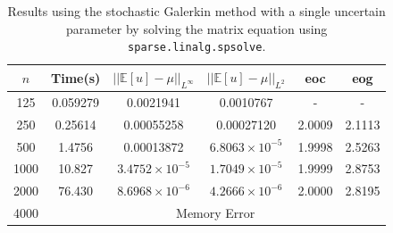 \documentclass[11pt]{article}
\numberwithin{equation}{section}
\begin{document}
\begin{table}[H]
\centering
\begin{tabular}{|c|c|c|c|c|c|}
\hline
$n$ & Time(s) & $|| \mathbb{E}[u] - \mu ||_{L^{\infty}}$ & $|| \mathbb{E}[u] - \mu ||_{L^{2}}$ & eoc & eog \\
\hline
125 & 0.059279 & 0.0021941 & 0.0010767 & - & - \\
250 & 0.25614 & 0.00055258 & 0.00027120 & 2.0009 & 2.1113 \\
500 & 1.4756 & 0.00013872 & $6.8063 \times 10^{-5}$ & 1.9998 & 2.5263 \\
1000 & 10.827 & $3.4752 \times 10^{-5}$ & $1.7049 \times 10^{-5}$ & 1.9999 & 2.8753 \\
2000 & 76.430 & $8.6968 \times 10^{-6}$ & $4.2666 \times 10^{-6}$ & 2.0000 & 2.8195 \\
\cline{2-6}
4000 & \multicolumn{5}{c|}{Memory Error} \\
\hline
\end{tabular}
\captionsetup{justification=centering}
\caption{Results using the stochastic Galerkin method with a single uncertain parameter by solving the matrix equation using \texttt{sparse.linalg.spsolve}.}
\label{table:stochastic matrix}
\end{table}
\end{document}
